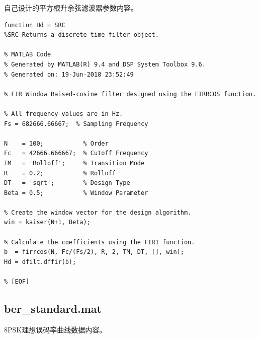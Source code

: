 \begin{spacing}{1.5}
自己设计的平方根升余弦滤波器参数内容。

\begin{lstlisting}
function Hd = SRC
%SRC Returns a discrete-time filter object.

% MATLAB Code
% Generated by MATLAB(R) 9.4 and DSP System Toolbox 9.6.
% Generated on: 19-Jun-2018 23:52:49

% FIR Window Raised-cosine filter designed using the FIRRCOS function.

% All frequency values are in Hz.
Fs = 682666.66667;  % Sampling Frequency

N    = 100;           % Order
Fc   = 42666.666667;  % Cutoff Frequency
TM   = 'Rolloff';     % Transition Mode
R    = 0.2;           % Rolloff
DT   = 'sqrt';        % Design Type
Beta = 0.5;           % Window Parameter

% Create the window vector for the design algorithm.
win = kaiser(N+1, Beta);

% Calculate the coefficients using the FIR1 function.
b  = firrcos(N, Fc/(Fs/2), R, 2, TM, DT, [], win);
Hd = dfilt.dffir(b);

% [EOF]
\end{lstlisting}

\subsection{ber\_standard.mat}

8PSK理想误码率曲线数据内容。


\end{spacing}
